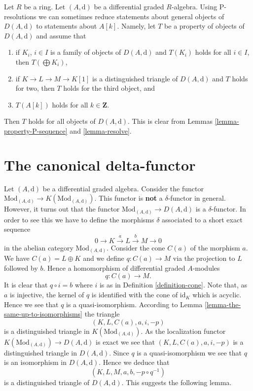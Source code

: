 \begin{remark}
\label{remark-P-resolution}
Let $R$ be a ring. Let $(A, \text{d})$ be a differential graded $R$-algebra.
Using P-resolutions we can sometimes reduce statements about general
objects of $D(A, \text{d})$ to statements about $A[k]$. Namely, let
$T$ be a property of objects of $D(A, \text{d})$ and assume that
\begin{enumerate}
\item if $K_i$, $i \in I$ is a family of objects of $D(A, \text{d})$
and $T(K_i)$ holds for all $i \in I$, then $T(\bigoplus K_i)$,
\item if $K \to L \to M \to K[1]$ is a distinguished triangle of
$D(A, \text{d})$ and $T$ holds for two, then $T$
holds for the third object, and
\item $T(A[k])$ holds for all $k \in \mathbf{Z}$.
\end{enumerate}
Then $T$ holds for all objects of $D(A, \text{d})$. This is clear from
Lemmas \ref{lemma-property-P-sequence} and \ref{lemma-resolve}.
\end{remark}







\section{The canonical delta-functor}
\label{section-canonical-delta-functor}

\noindent
Let $(A, \text{d})$ be a differential graded algebra.
Consider the functor
$\text{Mod}_{(A, \text{d})} \to K(\text{Mod}_{(A, \text{d})})$.
This functor is {\bf not} a $\delta$-functor in general.
However, it turns out that the functor
$\text{Mod}_{(A, \text{d})} \to D(A, \text{d})$ is a
$\delta$-functor. In order to see this we have to define
the morphisms $\delta$ associated to a short exact sequence
$$
0 \to K \xrightarrow{a} L \xrightarrow{b} M \to 0
$$
in the abelian category $\text{Mod}_{(A, \text{d})}$.
Consider the cone $C(a)$ of the morphism $a$. We have $C(a) = L \oplus K$
and we define $q : C(a) \to M$ via the projection to $L$ followed
by $b$. Hence a homomorphism of differential graded $A$-modules
$$
q : C(a) \longrightarrow M.
$$
It is clear that $q \circ i = b$ where $i$ is as in
Definition \ref{definition-cone}.
Note that, as $a$ is injective, the kernel of $q$ is identified with the
cone of $\text{id}_K$ which is acyclic. Hence we see that
$q$ is a quasi-isomorphism. According to
Lemma \ref{lemma-the-same-up-to-isomorphisms}
the triangle
$$
(K, L, C(a), a, i, -p)
$$
is a distinguished triangle in $K(\text{Mod}_{(A, \text{d})})$.
As the localization functor
$K(\text{Mod}_{(A, \text{d})}) \to D(A, \text{d})$ is
exact we see that $(K, L, C(a), a, i, -p)$ is a distinguished
triangle in $D(A, \text{d})$. Since $q$ is a quasi-isomorphism
we see that $q$ is an isomorphism in $D(A, \text{d})$.
Hence we deduce that
$$
(K, L, M, a, b, -p \circ q^{-1})
$$
is a distinguished triangle of $D(A, \text{d})$.
This suggests the following lemma.

